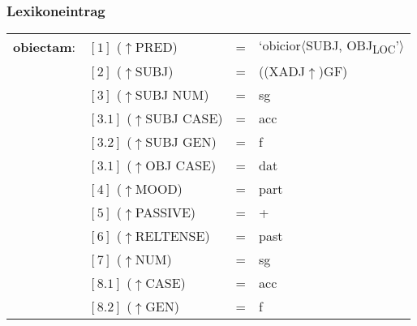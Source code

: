 \documentclass[12pt,a4paper]{article}
\begin{document}
\subsubsection{Lexikoneintrag}
\begin{singlespace}
\begin{tabular}{ l  l  l  l  } 
\textbf{obiectam}: & $[1]$ \:  ($\uparrow$PRED) & = & `obicior$\langle$SUBJ, OBJ\textsubscript{LOC}'$\rangle$\\
$\qquad$ & $[2]$ \:  ($\uparrow$SUBJ) & = & ((XADJ$\uparrow$)GF)\\
$\qquad$ & $[3]$ \:  ($\uparrow$SUBJ NUM) & = & sg \\
$\qquad$ & $[3.1]$ \: ($\uparrow$SUBJ CASE) & = & acc \\
$\qquad$ & $[3.2]$ \: ($\uparrow$SUBJ GEN) & = & f \\
$\qquad$ & $[3.1]$ \: ($\uparrow$OBJ CASE) & = & dat \\
$\qquad$ & $[4]$ \:  ($\uparrow$MOOD) & = & part\\
$\qquad$ & $[5]$ \:  ($\uparrow$PASSIVE) & = & + \\
$\qquad$ & $[6]$ \:  ($\uparrow$RELTENSE) & = & past \\
$\qquad$ & $[7]$ \:  ($\uparrow$NUM) & = & sg \\
$\qquad$ & $[8.1]$ \: ($\uparrow$CASE) & = & acc \\
$\qquad$ & $[8.2]$ \: ($\uparrow$GEN) & = & f \\
\end{tabular}
\newline
\newline
\end{singlespace}
\end{document}
